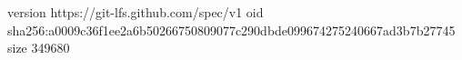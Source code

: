 version https://git-lfs.github.com/spec/v1
oid sha256:a0009c36f1ee2a6b50266750809077c290dbde099674275240667ad3b7b27745
size 349680
